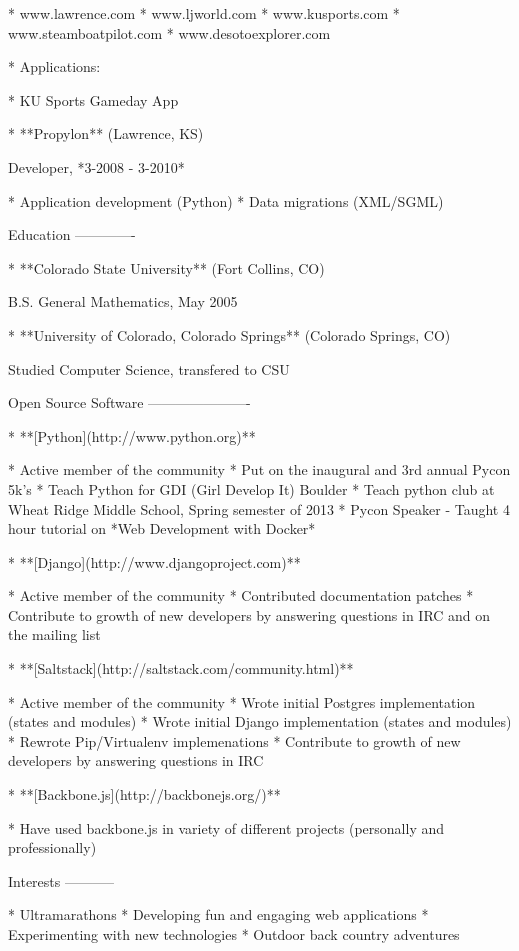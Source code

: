         *   www.lawrence.com
        *   www.ljworld.com
        *   www.kusports.com
        *   www.steamboatpilot.com
        *   www.desotoexplorer.com

    *   Applications:

        *   KU Sports Gameday App

*   **Propylon** (Lawrence, KS)

    Developer, *3-2008 - 3-2010*

    *   Application development (Python)
    *   Data migrations (XML/SGML)

Education
-------------

*   **Colorado State University** (Fort Collins, CO)

    B.S. General Mathematics, May 2005

*   **University of Colorado, Colorado Springs** (Colorado Springs, CO)

    Studied Computer Science, transfered to CSU

Open Source Software
----------------------

*   **[Python](http://www.python.org)**

    *   Active member of the community
    *   Put on the inaugural and 3rd annual Pycon 5k's
    *   Teach Python for GDI (Girl Develop It) Boulder
    *   Teach python club at Wheat Ridge Middle School, Spring semester of 2013
    *   Pycon Speaker
        -   Taught 4 hour tutorial on *Web Development with Docker*

*   **[Django](http://www.djangoproject.com)**

    *   Active member of the community
    *   Contributed documentation patches
    *   Contribute to growth of new developers by answering questions in IRC and on the mailing list

*   **[Saltstack](http://saltstack.com/community.html)**

    *   Active member of the community
    *   Wrote initial Postgres implementation (states and modules)
    *   Wrote initial Django implementation (states and modules)
    *   Rewrote Pip/Virtualenv implemenations
    *   Contribute to growth of new developers by answering questions in IRC

*   **[Backbone.js](http://backbonejs.org/)**

    *   Have used backbone.js in variety of different projects (personally and professionally)

Interests
-----------

*   Ultramarathons
*   Developing fun and engaging web applications
*   Experimenting with new technologies
*   Outdoor back country adventures

